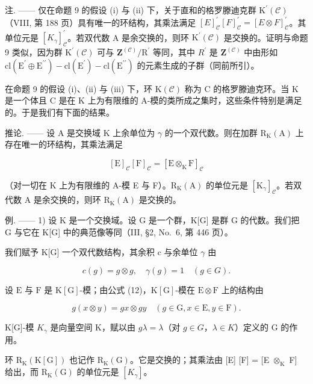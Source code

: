 注. —— 仅在命题 9 的假设 (i) 与 (ii) 下，关于直和的格罗滕迪克群 \(\mathrm{K}^{\prime}(\mathcal{C})\)（VIII, 第 188 页）具有唯一的环结构，其乘法满足 \([E]_{\mathcal{C}}^{\prime}[F]_{\mathcal{C}}^{\prime} = [E \otimes F]_{\mathcal{C}}^{\prime}\)。其单位元是 \([K_{\gamma}]_{\mathcal{C}}^{\prime}\)。若双代数 A 是余交换的，则环 \(\mathrm{K}^{\prime}(\mathcal{C})\) 是交换的。证明与命题 9 类似，因为群 \(\mathrm{K}^{\prime}(\mathcal{C})\) 可与 \(\mathbf{Z}^{(\mathcal{C})}/\mathrm{R}^{\prime}\) 等同，其中 \(R^{\prime}\) 是 \(\mathbf{Z}^{(\mathcal{C})}\) 中由形如 \(\mathrm{cl}(\mathrm{E}^{\prime} \oplus \mathrm{E}^{\prime\prime}) - \mathrm{cl}(\mathrm{E}^{\prime}) - \mathrm{cl}(\mathrm{E}^{\prime\prime})\) 的元素生成的子群（同前所引）。

在命题 9 的假设 (i)、(ii) 与 (iii) 下，环 \(\mathrm{K}(\mathcal{C})\) 称为 C 的格罗滕迪克环。当 K 是一个体且 C 是在 K 上为有限维的 A-模的类所成之集时，这些条件特别是满足的。于是我们有下面的结果。

推论. —— 设 A 是交换域 K 上余单位为 \(\gamma\) 的一个双代数。则在加群 \(\mathrm{R}_{\mathrm{K}}(\mathrm{A})\) 上存在唯一的环结构，其乘法满足

\[
[ \mathrm{E} ] _ {\mathcal {C}} [ \mathrm{F} ] _ {\mathcal {C}} = [ \mathrm{E} \otimes_ {\mathrm{K}} \mathrm{F} ] _ {\mathcal {C}}
\]

（对一切在 K 上为有限维的 A-模 E 与 F）。\(\mathrm{R}_{\mathrm{K}}(\mathrm{A})\) 的单位元是 \([\mathrm{K}_{\gamma}]_{\mathcal{C}}\)。若双代数 A 是余交换的，则环 \(\mathrm{R}_{\mathrm{K}}(\mathrm{A})\) 是交换的。

例. —— 1) 设 K 是一个交换域。设 G 是一个群，K{[}G{]} 是群 G 的代数。我们把 G 与它在 K{[}G{]} 中的典范像等同（III, §2, No.~6, 第 446 页）。

我们赋予 K{[}G{]} 一个双代数结构，其余积 c 与余单位 \(\gamma\) 由

\[
c (g) = g \otimes g, \quad \gamma (g) = 1 \quad (g \in G).\tag{15}
\]

设 \(\mathrm{E}\) 与 \(\mathrm{F}\) 是 \(\mathrm{K}[\mathrm{G}]\)-模；由公式 (12)，\(\mathrm{K}[\mathrm{G}]\)-模在 \(\mathrm{E} \otimes \mathrm{F}\) 上的结构由

\[
g (x \otimes y) = g x \otimes g y \quad (g \in \mathrm{G}, x \in \mathrm{E}, y \in \mathrm{F}).\tag{16}
\]

K{[}G{]}-模 \(K_{\gamma}\) 是向量空间 K，赋以由 \(g\lambda = \lambda\)（对 \(g \in G\)，\(\lambda \in K\)）定义的 G 的作用。

环 \(\mathrm{R}_{\mathrm{K}}(\mathrm{K}[\mathrm{G}])\) 也记作 \(\mathrm{R}_{\mathrm{K}}(\mathrm{G})\)。它是交换的；其乘法由 {[}E{]} {[}F{]} = {[}E \(\otimes_{\mathrm{K}}\) F{]} 给出，而 \(\mathrm{R}_{\mathrm{K}}(\mathrm{G})\) 的单位元是 \([K_{\gamma}]\)。

